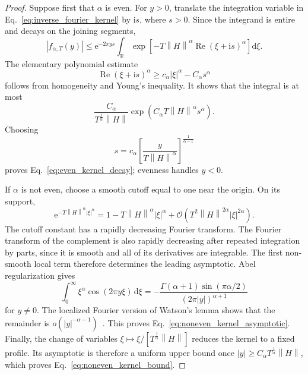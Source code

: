 \documentclass[aps,pra,reprint,floatfix,unsortedaddress,superscriptaddress]{revtex4-2}
\newcommand{\norm}[1]{\left\lVert#1\right\rVert}
\newcommand{\abs}[1]{\left\lvert#1\right\rvert}
\newcommand{\Ocal}{\mathcal{O}}
\begin{document}
\begin{proof}
Suppose first that $\alpha$ is even.  For $y>0$, translate the
integration variable in Eq.~\eqref{eq:inverse_fourier_kernel} by
$\mathrm is$, where $s>0$.  Since the integrand is entire and
decays on the joining segments,
\[
    \abs{f_{\alpha,T}(y)}
    \leq
    \mathrm e^{-2\pi ys}
    \int_{\mathbb R}
    \exp\!\left[
       -T\norm{H}^{\alpha}
       \operatorname{Re}(\xi+\mathrm is)^\alpha
    \right]\mathrm d\xi.
\]
The elementary polynomial estimate
\[
    \operatorname{Re}(\xi+\mathrm is)^\alpha
    \geq
    c_\alpha\abs{\xi}^{\alpha}
    -
    C_\alpha s^\alpha
\]
follows from homogeneity and Young's inequality.  It shows that the
integral is at most
\[
    \frac{C_\alpha}{T^{\frac{1}{\alpha}}\norm{H}}
    \exp(C_\alpha T\norm{H}^{\alpha}s^\alpha).
\]
Choosing
\[
    s=c_\alpha
    \left[
    \frac{y}{T\norm{H}^{\alpha}}
    \right]^{\frac{1}{\alpha-1}}
\]
proves
Eq.~\eqref{eq:even_kernel_decay}; evenness handles $y<0$.

If $\alpha$ is not even, choose a smooth cutoff equal to one near the
origin.  On its support,
\[
    \mathrm e^{-T\norm{H}^{\alpha}\abs{\xi}^{\alpha}}
    =1-T\norm{H}^{\alpha}\abs{\xi}^{\alpha}
    +\Ocal(T^2\norm{H}^{2\alpha}\abs{\xi}^{2\alpha}).
\]
The cutoff constant has a rapidly decreasing Fourier transform.  The
Fourier transform of the complement is also rapidly decreasing after
repeated integration by parts, since it is smooth and all of its
derivatives are integrable.  The first non-smooth local term therefore
determines the leading asymptotic.  Abel regularization gives
\[
    \int_0^\infty
    \xi^\alpha\cos(2\pi y\xi)\,\mathrm d\xi
    =
    -\frac{\Gamma(\alpha+1)\sin(\pi\alpha/2)}
    {(2\pi\abs{y})^{\alpha+1}}
\]
for $y\ne0$.  The localized Fourier version of Watson's lemma shows
that the remainder is $o(\abs{y}^{-\alpha-1})$~\cite{wong2001asymptotic}.
This proves Eq.~\eqref{eq:noneven_kernel_asymptotic}.  Finally, the
change of variables
$\xi\mapsto\xi/[T^{\frac{1}{\alpha}}\norm{H}]$ reduces the kernel to a fixed
profile.  Its asymptotic is therefore a uniform upper bound once
$\abs{y}\geq C_\alpha T^{\frac{1}{\alpha}}\norm{H}$, which proves
Eq.~\eqref{eq:noneven_kernel_bound}.
\end{proof}
\end{document}
